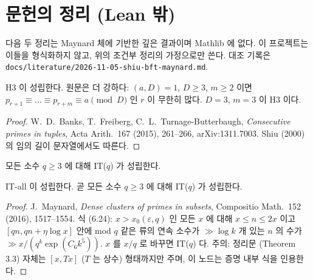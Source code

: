 \section{문헌의 정리 (Lean 밖)}

다음 두 정리는 Maynard 체에 기반한 깊은 결과이며 Mathlib 에 없다. 이 프로젝트는 이들을 형식화하지 않고,
위의 조건부 정리의 가정으로만 쓴다. 대조 기록은 \texttt{docs/literature/2026-11-05-shiu-bft-maynard.md}.

\begin{theorem}
  \label{thm:lit-BFT}
  H3 이 성립한다. 원문은 더 강하다: \((a, D) = 1\), \(D \ge 3\), \(m \ge 2\) 이면
  \(p_{r+1} \equiv \dots \equiv p_{r+m} \equiv a \pmod D\) 인 \(r\) 이 무한히 많다. \(D = 3\), \(m = 3\) 이 H3 이다.
\end{theorem}
\begin{proof}
  W.~D.~Banks, T.~Freiberg, C.~L.~Turnage-Butterbaugh, \emph{Consecutive primes in tuples},
  Acta Arith.~167 (2015), 261--266, arXiv:1311.7003. Shiu (2000) 의 임의 길이 문자열에서도 따른다.
\end{proof}

\begin{definition}[가정 IT-all]
  \label{def:IT-all}
  \leanok
  모든 소수 \(q \ge 3\) 에 대해 IT(\(q\)) 가 성립한다.
\end{definition}

\begin{theorem}
  \label{thm:lit-Maynard}
  IT-all 이 성립한다. 곧 모든 소수 \(q \ge 3\) 에 대해 IT(\(q\)) 가 성립한다.
\end{theorem}
\begin{proof}
  J.~Maynard, \emph{Dense clusters of primes in subsets}, Compositio Math.~152 (2016), 1517--1554.
  식 (6.24): \(x > x_0(\varepsilon, q)\) 인 모든 \(x\) 에 대해 \(x \le n \le 2x\) 이고
  \([qn, qn + \eta \log x]\) 안에 mod \(q\) 같은 류의 연속 소수가 \(\gg \log k\) 개 있는 \(n\) 의 수가
  \(\gg x / (q^k \exp(C_6 k^5))\). \(x\) 를 \(x/q\) 로 바꾸면 IT(\(q\)) 다.
  주의: 정리문 (Theorem 3.3) 자체는 \([x, Tx]\) (\(T\) 는 상수) 형태까지만 주며, 이 노드는 증명 내부 식을 인용한다.
\end{proof}

